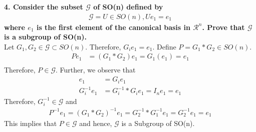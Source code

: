 \documentclass[11pt]{article}
\begin{document}
\textbf{4. Consider the subset $\mathcal{G}$ of SO(n) defined by
\begin{align*}
\mathcal{G} = {U \in SO(n) , Ue_1 = e_1}
\end{align*}
where $e_1$ is the first element of the canonical basis in $\mathcal{R}^n$. Prove that $\mathcal{G}$ is a subgroup of SO(n).}\\
Let $G_1, G_2 \in \mathcal{G} \subset SO(n)$. Therefore, $G_i e_1 = e_1$. Define $P = G_1*G_2 \in SO(n)$.
\begin{align*}
Pe_1 &= (G_1*G_2)e_1 = G_1(e_1) = e_1\\
\end{align*} Therefore, $P \in \mathcal{G}$.
Further, we observe that
\begin{align*}
e_1 &= G_ie_1\\
G_i^{-1}e_1 &= G_i^{-1}*G_i e_1 = I_ne_1 = e_1
\end{align*}
Therefore, $G_i^{-1} \in \mathcal{G}$ and
\begin{align*}
P^{-1}e_1 = (G_1*G_2)^{-1}e_1 = G_2^{-1}*G_1^{-1}e_1 = G_2^{-1}e_1 = e_1
\end{align*}
This implies that $P \in \mathcal{G}$ and hence, $\mathcal{G}$ is a Subgroup of SO(n).

\hrulefill
\end{document}
